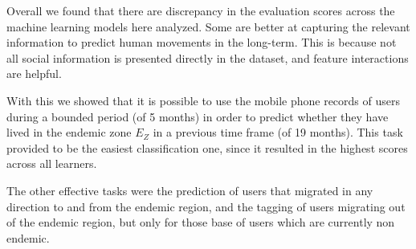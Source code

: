 Overall we found that there are discrepancy in the evaluation scores across the machine learning models here analyzed.
Some are better at capturing the relevant information to predict human movements in the long-term.
This is because not all social information is presented directly in the dataset, and feature interactions are helpful.

With this we showed that it is possible to use the mobile phone records of users during a bounded period (of 5 months) in order to predict whether they have lived in the endemic zone $E_Z$ in a previous time frame (of 19 months).
This task provided to be the easiest classification one, since it resulted in the highest scores across all learners.

The other effective tasks were the prediction of users that migrated in any direction to and from the endemic region, and the tagging of users migrating out of the endemic region, but only for those base of users which are currently non endemic.










